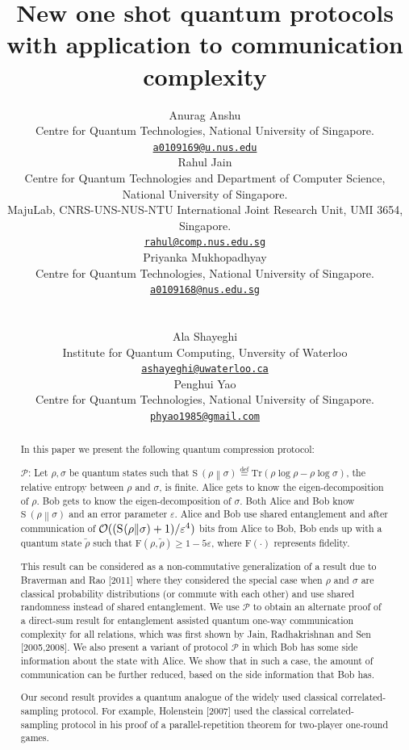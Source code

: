 \documentclass[11pt,a4paper]{article}
\def\F{\mathrn{F}}
\def\O{\CMcal{O}}
\theoremstyle{plain}
\theoremstyle{definition}
\newcommand {\br} [1] {\ensuremath{ \left( #1 \right) }}
\newcommand {\minusspace} {\: \! \!}
\newcommand {\fn} [2] {\ensuremath{ #1 \minusspace \br{ #2 } }}
\newcommand {\defeq} {\ensuremath{ \stackrel{\mathrm{def}}{=} }}
\newcommand {\relent} [2] {\fn{\mathrm{S}}{#1 \middle\| #2}}
\newcommand {\email} [1] {\href{mailto:#1}{\texttt{#1}}}
\newcommand {\Tr} {\ensuremath{ \mathrm{Tr} }}
\newcommand {\Prot}{\mathcal{P}}
\def\ve{{\varepsilon}}
\def\F{\mathrm{F}}
\newcommand {\mytitle} {New one shot quantum protocols with application to communication complexity}
\newcommand {\Rahul}   {Rahul Jain}
\newcommand {\Anurag}  {Anurag Anshu}
\newcommand {\Penghui} {Penghui Yao}
\newcommand {\Priyanka} {Priyanka Mukhopadhyay}
\newcommand {\Ala}{Ala Shayeghi}
\newcommand {\CQT} {Centre for Quantum Technologies}
\newcommand {\CQTCS} {\CQT{} and Department of Computer Science}
\newcommand {\NUS} {National University of Singapore.}
\newcommand {\IQC} {Institute for Quantum Computing, Unversity of Waterloo}
\newcommand {\Maju} {MajuLab, CNRS-UNS-NUS-NTU International Joint Research Unit, UMI 3654, Singapore.}
\newcommand {\authorblock} [3] {
	\begin{minipage}[t]{0.3\linewidth}
		\centering
		{#1}\\[0.8ex]
		{\footnotesize {#2}\\[-0.7ex]
		\email{#3}}
	\end{minipage}\vspace{1ex}
}
\begin{document}
\begin{titlepage}
\title{\textbf{\mytitle}\\[2ex]}

\author{
    \authorblock{\Anurag}{\CQT, \NUS}{a0109169@u.nus.edu}
	\authorblock{\Rahul}{\CQTCS, \NUS  \\ \Maju}{rahul@comp.nus.edu.sg}
	\authorblock{\Priyanka}{\CQT, \NUS}{a0109168@nus.edu.sg}\\
    \authorblock{\Ala}{\IQC}{ashayeghi@uwaterloo.ca}
	\authorblock{\Penghui}{\CQT, \NUS}{phyao1985@gmail.com}
}


\clearpage\maketitle
\thispagestyle{empty}


\begin{abstract}
In this paper we present the following quantum compression protocol:

\bigskip
\noindent $\Prot$: Let $\rho,\sigma$ be quantum states such that $\relent{\rho}{\sigma} \defeq \Tr (\rho \log \rho - \rho \log \sigma)$, the relative entropy between $\rho$ and $\sigma$, is finite. Alice gets to know the eigen-decomposition of $\rho$. Bob gets to know the eigen-decomposition of $\sigma$. Both Alice and Bob know $ \relent{\rho}{\sigma}$ and an error parameter $\ve$. Alice and Bob use shared entanglement and after communication of $\O((\relent{\rho}{\sigma}+1)/\ve^4)$ bits from Alice to Bob, Bob ends up with a quantum state $\tilde{\rho}$ such that $\F(\rho, \tilde{\rho}) \geq 1 - 5\ve$, where $\F(\cdot)$ represents fidelity.


\bigskip 

This result can be considered as a non-commutative generalization of a result due to Braverman and Rao [2011] where they considered the special case when $\rho$ and $\sigma$ are classical probability distributions (or commute with each other) and use shared randomness instead of shared entanglement. We use $\Prot$ to obtain an alternate proof of a direct-sum result for entanglement assisted quantum one-way communication complexity for all relations, which was first shown by Jain, Radhakrishnan and Sen [2005,2008]. We also present a  variant of protocol $\Prot$ in which Bob has some side information about the state with Alice. We show that in such a case, the amount of communication can be further reduced, based on the side information that Bob has.

Our second result provides a quantum analogue of the widely used classical correlated-sampling protocol. For example, Holenstein [2007] used the classical correlated-sampling protocol in his proof of a parallel-repetition theorem for two-player one-round games. 
\end{abstract}
\end{titlepage}
\end{document}
